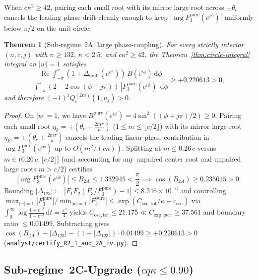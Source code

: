 \documentclass[10pt]{article}
\numberwithin{equation}{section}
\theoremstyle{plain}
\newtheorem{theorem}{Theorem}[section]
\theoremstyle{definition}
\newcommand{\dd}{\mathrm{d}}
\newcommand{\1}{\mathbf{1}}
\DeclareMathOperator{\re}{Re}
\newcommand{\code}[1]{\texttt{#1}}
\begin{document}
When $c\kappa^2 \ge 42$, pairing each small root with its mirror large root across $\pm\theta_c$ cancels the leading phase drift cleanly enough to keep $|\arg F_3^{\mathrm{pure}}(e^{i\phi})|$ uniformly below $\pi/2$ on the unit circle.

\begin{theorem}[Sub-regime~2A: large phase-coupling]\label{thm:R2-2A}
For every strictly interior $(n, c, j)$ with $n \ge 132$, $\kappa < 2.5$, and $c\kappa^2 \ge 42$, the Theorem~\ref{thm:circle-integral} integral on $|w| = 1$ satisfies
\[
\frac{\re\int_{-\pi}^{\pi} (1 + \Delta_{\mathrm{mult}}(e^{i\phi}))\, B(e^{i\phi})\,\dd\phi}{\int_{-\pi}^{\pi} (2 - 2\cos(\phi + j\pi))\, |F_3^{\mathrm{pure}}(e^{i\phi})|\,\dd\phi} \ge +0.220613 > 0,
\]
and therefore $(-1)^j Q_c^{(2m)}(1, u_j) > 0$.
\end{theorem}

\begin{proof}
On $|w| = 1$, we have $B^{\mathrm{pure}}(e^{i\phi}) = 4\sin^2((\phi + j\pi)/2) \ge 0$. Pairing each small root $\eta_k = \pm(\theta_c - \frac{2m\pi}{n})$ ($1 \le m \le \lfloor c/2 \rfloor$) with its mirror large root $\eta_{k'} = \pm(\theta_c + \frac{2m\pi}{n})$ cancels the leading linear phase contribution in $\arg F_3^{\mathrm{pure}}(e^{i\phi})$ up to $O(m^2/(c\kappa))$. Splitting at $m \le 0.26\, c$ versus $m \in (0.26\, c, \lfloor c/2 \rfloor]$ (and accounting for any unpaired center root and unpaired large roots $m > c/2$) certifies
\[
|\arg F_3^{\mathrm{pure}}(e^{i\phi})| \le B_{2A} \le 1.332945 < \frac{\pi}{2} \implies \cos(B_{2A}) \ge 0.235615 > 0.
\]
Bounding $|\Delta_{123}| := |F_1 F_2 (F_3/F_3^{\mathrm{pure}}) - 1| \le 8.246 \times 10^{-6}$ and controlling $\max_{|w|=1}|F_3^{\mathrm{pure}}|/\min_{|w|=1}|F_3^{\mathrm{pure}}| \le \exp(C_{\mathrm{osc,tot}}/\kappa + c_{\mathrm{osc}})$ via $\int_0^\infty \log\frac{1+e^{-t}}{1-e^{-t}}\,\dd t = \frac{\pi^2}{4}$ yields $C_{\mathrm{osc,tot}} \le 21.175 \ll C_{\mathrm{exp,pert}} \ge 37.561$ and boundary ratio $\le 0.01499$. Subtracting gives $\cos(B_{2A}) - |\Delta_{123}| - (1 + |\Delta_{123}|)\cdot 0.01499 \ge +0.220613 > 0$ (\code{analyst/certify\_R2\_1\_and\_2A\_iv.py}).
\end{proof}

\subsection{Sub-regime~2C-Upgrade (\texorpdfstring{$c q \kappa \le 0.90$}{c q kappa <= 0.90})}
\label{sec:R2-2C}
\end{document}
